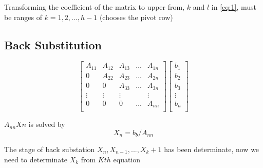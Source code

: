 \documentclass[a4paper]{article}
\numberwithin{equation}{subsection}
\begin{document}
\vspace{5mm} %
Transforming the coefficient of the matrix to upper from, $k$ and $l$ in \ref{eq:1}, must be ranges of $k = 1, 2, ... , h-1$ (chooses the pivot row)



\vspace{5mm} %
\subsection{Back Substitution}
\begin{equation} \tag{M2}
    \begin{bmatrix}
A_{11} & A_{12} & A_{13} & \dots & A_{1n} \\
0 & A_{22} & A_{23} & \dots & A_{2n} \\
0 & 0 & A_{33} & \dots & A_{3n} \\
\vdots & \vdots & \vdots &  & \vdots \\
0 & 0 & 0 & \dots & A_{nn} \\
\end{bmatrix}
\begin{bmatrix}
b_1  \\
b_2 \\
b_3  \\
 \vdots \\
b_n  \\
\end{bmatrix}
\end{equation}



\vspace{5mm} %
$A_{nn}Xn$ is solved by
\begin{equation} \tag{1.2}
    X_n = b_b/A_{nn}
\end{equation}



\vspace{5mm} %
The stage of back substation $X_n, X_{n-1},...,X_k+1$ has been determinate, now we need to determinate $X_k$ from $Kth$ equation
\end{document}
